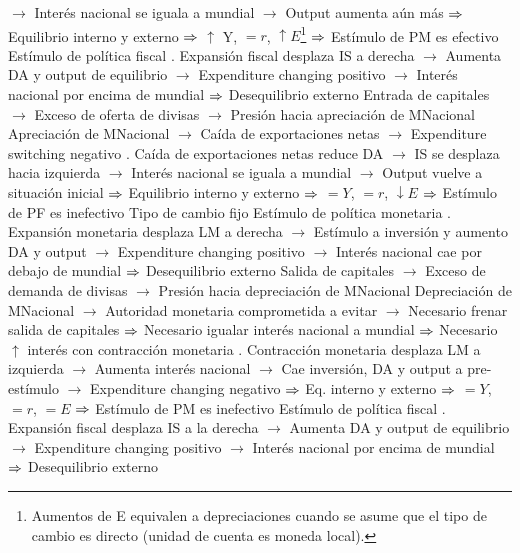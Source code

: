 \documentclass{nuevotema}
\begin{document}
\begin{esquemal}
				\4[] $\to$ Interés nacional se iguala a mundial
				\4[] $\to$ Output aumenta aún más
				\4[] $\Rightarrow$ Equilibrio interno y externo
				\4[] $\Rightarrow$ $\uparrow$ Y, $=r$, $\uparrow E$\footnote{Aumentos de E equivalen a depreciaciones cuando se asume que el tipo de cambio es directo (unidad de cuenta es moneda local).}
				\4[] $\Rightarrow$ Estímulo de PM es efectivo
				\4[] 
				\4 Estímulo de política fiscal
				. Expansión fiscal desplaza IS a derecha
				\4[] $\to$ Aumenta DA y output de equilibrio
				\4[] $\to$ Expenditure changing positivo
				\4[] $\to$ Interés nacional por encima de mundial
				\4[] $\Rightarrow$ Desequilibrio externo
				\4[] Entrada de capitales
				\4[] $\to$ Exceso de oferta de divisas
				\4[] $\to$ Presión hacia apreciación de MNacional
				\4[] Apreciación de MNacional
				\4[] $\to$ Caída de exportaciones netas
				\4[] $\to$ Expenditure switching negativo
				. Caída de exportaciones netas reduce DA
				\4[] $\to$ IS se desplaza hacia izquierda
				\4[] $\to$ Interés nacional se iguala a mundial
				\4[] $\to$ Output vuelve a situación inicial
				\4[] $\Rightarrow$ Equilibrio interno y externo
				\4[] $\Rightarrow$ $= Y$, $= r$, $\downarrow E$
				\4[] $\Rightarrow$ Estímulo de PF es inefectivo
				\4[] 
			\3 Tipo de cambio fijo
				\4 Estímulo de política monetaria
				. Expansión monetaria desplaza LM a derecha
				\4[] $\to$ Estímulo a inversión y aumento DA y output
				\4[] $\to$ Expenditure changing positivo
				\4[] $\to$ Interés nacional cae por debajo de mundial
				\4[] $\Rightarrow$ Desequilibrio externo
				\4[] Salida de capitales
				\4[] $\to$ Exceso de demanda de divisas
				\4[] $\to$ Presión hacia depreciación de MNacional
				\4[] Depreciación de MNacional
				\4[] $\to$ Autoridad monetaria comprometida a evitar
				\4[] $\to$ Necesario frenar salida de capitales
				\4[] $\Rightarrow$ Necesario igualar interés nacional a mundial
				\4[] $\Rightarrow$ Necesario $\uparrow$ interés con contracción monetaria
				. Contracción monetaria desplaza LM a izquierda
				\4[] $\to$ Aumenta interés nacional
				\4[] $\to$ Cae inversión, DA y output a pre-estímulo
				\4[] $\to$ Expenditure changing negativo
				\4[] $\Rightarrow$ Eq. interno y externo
				\4[] $\Rightarrow$ $= Y$, $= r$, $= E$
				\4[] $\Rightarrow$ Estímulo de PM es inefectivo
				\4[] 
				\4 Estímulo de política fiscal
				. Expansión fiscal desplaza IS a la derecha
				\4[] $\to$ Aumenta DA y output de equilibrio
				\4[] $\to$ Expenditure changing positivo
				\4[] $\to$ Interés nacional por encima de mundial
				\4[] $\Rightarrow$ Desequilibrio externo

\end{esquemal}
\end{document}
